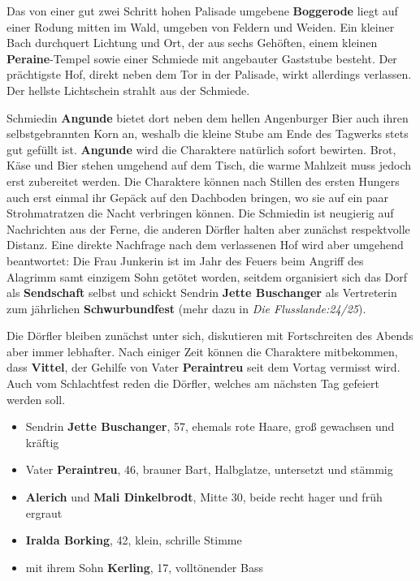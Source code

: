 Das von einer gut zwei Schritt hohen Palisade umgebene \textbf{Boggerode} liegt auf einer Rodung mitten im Wald, umgeben von Feldern und Weiden.
Ein kleiner Bach durchquert Lichtung und Ort, der aus sechs Gehöften, einem kleinen \textbf{Peraine}-Tempel sowie einer Schmiede mit angebauter Gaststube besteht.
Der prächtigste Hof, direkt neben dem Tor in der Palisade, wirkt allerdings verlassen.
Der hellste Lichtschein strahlt aus der Schmiede.
\begin{center}
\end{center}

Schmiedin \textbf{Angunde} bietet dort neben dem hellen Angenburger Bier auch ihren selbstgebrannten Korn an, weshalb die kleine Stube am Ende des Tagwerks stets gut gefüllt ist.
\textbf{Angunde} wird die Charaktere natürlich sofort bewirten.
Brot, Käse und Bier stehen umgehend auf dem Tisch, die warme Mahlzeit muss jedoch erst zubereitet werden.
Die Charaktere können nach Stillen des ersten Hungers auch erst einmal ihr Gepäck auf den Dachboden bringen, wo sie auf ein paar Strohmatratzen die Nacht verbringen können.
Die Schmiedin ist neugierig auf Nachrichten aus der Ferne, die anderen Dörfler halten aber zunächst respektvolle Distanz.
Eine direkte Nachfrage nach dem verlassenen Hof wird aber umgehend beantwortet:
Die Frau Junkerin ist im Jahr des Feuers beim Angriff des Alagrimm samt einzigem Sohn getötet worden, seitdem organisiert sich das Dorf als \textbf{Sendschaft} selbst und schickt Sendrin \textbf{Jette Buschanger} als Vertreterin zum jährlichen \textbf{Schwurbundfest} (mehr dazu in \emph{Die Flusslande:24/25}).


Die Dörfler bleiben zunächst unter sich, diskutieren mit Fortschreiten des Abends aber immer lebhafter.
Nach einiger Zeit können die Charaktere mitbekommen, dass \textbf{Vittel}, der Gehilfe von Vater \textbf{Peraintreu} seit dem Vortag vermisst wird.
Auch vom Schlachtfest reden die Dörfler, welches am nächsten Tag gefeiert werden soll.

\begin{itemize}
	\item Sendrin \textbf{Jette Buschanger}, 57, ehemals rote Haare, groß gewachsen und kräftig
	\item Vater \textbf{Peraintreu}, 46, brauner Bart, Halbglatze, untersetzt und stämmig
	\item \textbf{Alerich} und \textbf{Mali Dinkelbrodt}, Mitte 30, beide recht hager und früh ergraut
	\item \textbf{Iralda Borking}, 42, klein, schrille Stimme
	\item mit ihrem Sohn \textbf{Kerling}, 17, volltönender Bass
\end{itemize}

